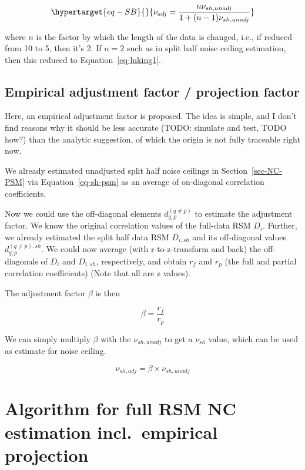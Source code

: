 \documentclass[
  letterpaper,
  DIV=11,
  numbers=noendperiod]{scrartcl}
\begin{document}
\begin{equation}\protect\hypertarget{eq-SB}{}{
\nu_{adj}=\frac{n \nu_{sh,unadj}}{1+(n-1) \nu_{sh,unadj}}
}\label{eq-SB}\end{equation}

where \(n\) is the factor by which the length of the data is changed,
i.e., if reduced from 10 to 5, then it's 2. If \(n=2\) such as in split
half noise ceiling estimation, then this reduced to
Equation~\ref{eq-luking1}.

\hypertarget{sec-adj-emp}{%
\subsection{Empirical adjustment factor / projection
factor}\label{sec-adj-emp}}

Here, an empirical adjustment factor is proposed. The idea is simple,
and I don't find reasons why it should be less accurate (TODO: simulate
and test, TODO how?) than the analytic suggestion, of which the origin
is not fully traceable right now.

We already estimated unadjusted split half noise ceilings in
Section~\ref{sec-NC-PSM} via Equation~\ref{eq-sh-psm} as an average of
on-diagonal correlation coefficients.

Now we could use the off-diagonal elements \(d_{q,p}^{(q \ne p)}\) to
estimate the adjustment factor. We know the original correlation values
of the full-data RSM \(D_i\). Further, we already estimated the split
half data RSM \(D_{i,sh}\) and its off-diagonal values
\(d_{q,p}^{(q \ne p), sh}\). We could now average (with r-to-z-transform
and back) the off-diagonals of \(D_i\) and \(D_{i,sh}\), respectively,
and obtain \(r_f\) and \(r_p\) (the full and partial correlation
coefficients) (Note that all are z values).

The adjustment factor \(\beta\) is then

\[
\beta =  \frac{r_f}{r_p}
\]

We can simply multiply \(\beta\) with the \(\nu_{sh,unadj}\) to get a
\(\nu_{sh}\) value, which can be used as estimate for noise ceiling.

\[
\nu_{sh,adj} =  \beta \times \nu_{sh, unadj} 
\]

\hypertarget{algorithm-for-full-rsm-nc-estimation-incl.-empirical-projection}{%
\section{Algorithm for full RSM NC estimation incl.~empirical
projection}\label{algorithm-for-full-rsm-nc-estimation-incl.-empirical-projection}}
\end{document}
